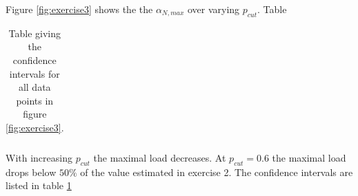 Figure \ref{fig:exercise3} shows the the $\alpha_{N,max}$ over varying $p_{cut}$. Table 

\begin{table}[H] 
\centering 
\begin{tabular}{|l|l|l|l|l|l|l|l|} 
\hline 
	
\hline
\end{tabular}
\label{tbl:exercise3_CI}
\caption{Table giving the confidence intervals for all data points in figure \ref{fig:exercise3}.}
\end{table} 

With increasing $p_{cut}$ the maximal load decreases. At $p_{cut} = 0.6$ the maximal load drops below $50\%$ of the value estimated in exercise 2. The confidence intervals are listed in table \ref{tbl:exercise3_CI}
